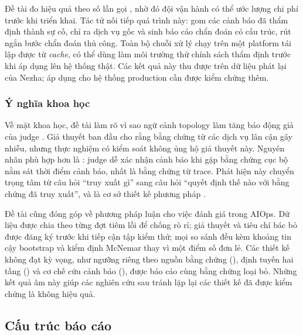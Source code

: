 Đề tài đo hiệu quả theo số lần gọi , nhờ đó đội vận hành có thể ước lượng chi phí trước khi
triển khai. Tác tử  nối tiếp quá trình này: gom các cảnh báo đã thẩm định thành sự cố, chỉ ra dịch vụ gốc và sinh báo cáo chẩn đoán có cấu trúc, rút ngắn bước chẩn đoán thủ công. Toàn bộ chuỗi xử lý chạy trên một platform tái lập được từ \textit{cache}, có thể dùng làm môi trường thử chính sách thẩm định trước khi áp dụng lên hệ thống thật. Các kết quả này thu được trên dữ liệu phát lại của Nezha; áp dụng cho hệ thống production cần được kiểm chứng thêm.

\subsubsection{Ý nghĩa khoa học}
\label{subsubsec:scientific_significance}

Về mặt khoa học, đề tài làm rõ vì sao ngữ cảnh topology làm tăng báo động giả của judge .
Giả thuyết ban đầu cho rằng bằng chứng từ các dịch vụ lân cận gây nhiễu, nhưng thực nghiệm có kiểm soát không ủng hộ giả thuyết này. Nguyên nhân phù hợp hơn là : judge dễ xác nhận cảnh báo khi gặp bằng chứng cục bộ nằm sát thời điểm cảnh báo, nhất là bằng chứng từ trace. Phát hiện này chuyển trọng tâm từ câu hỏi ``truy xuất gì'' sang câu hỏi ``quyết định thế nào với bằng chứng đã truy xuất'', và là cơ sở thiết kế phương pháp \CTAV{}.

Đề tài cũng đóng góp về phương pháp luận cho việc đánh giá  trong AIOps. Dữ liệu được chia theo từng đợt tiêm lỗi để chống rò rỉ; giả thuyết và tiêu chí bác bỏ được đăng ký trước khi tiếp cận tập kiểm thử; mọi so sánh đều kèm khoảng tin cậy bootstrap và kiểm định McNemar thay vì một điểm số đơn lẻ. Các thiết kế không đạt kỳ vọng, như ngưỡng riêng theo nguồn bằng chứng (), định tuyến hai tầng () và cơ chế cứu cảnh báo (), được báo cáo cùng bằng chứng loại bỏ. Những kết quả âm này giúp các nghiên cứu sau tránh lặp lại các thiết kế đã được kiểm chứng là không hiệu quả.

\subsection{Cấu trúc báo cáo}
\label{sec:ch1-cau-truc}

